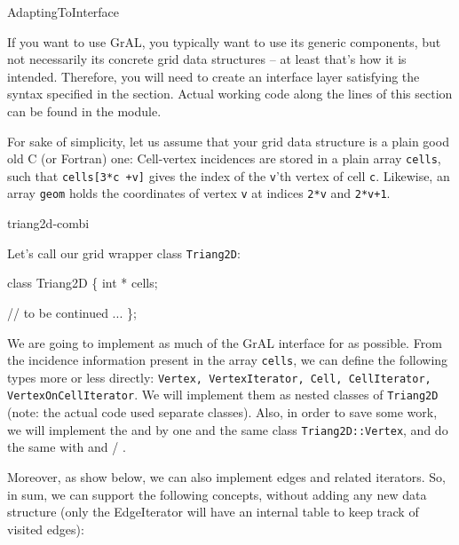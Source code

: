 \begin{Label}{AdaptingToInterface}
\end{Label}


If you want to use GrAL, you typically want to use its generic
components, but not necessarily its concrete grid data structures
-- at least that's how it is intended.
Therefore, you will need to create an interface layer 
satisfying the syntax specified in the  section.
Actual working code along the lines of this section 
can be found in the  module.

For sake of simplicity, let us assume that your grid data structure
is a plain  good old C (or Fortran) one:
Cell-vertex incidences are stored in a plain array \texttt{cells},
such that \texttt{cells[3*c +v]} gives the index of the \texttt{v}'th vertex
of cell \texttt{c}. 
Likewise, an array \texttt{geom} 
holds the coordinates of vertex \texttt{v}
at indices \texttt{2*v} and \texttt{2*v+1}.

\begin{Label}{triang2d-combi}
\end{Label}

Let's call our grid wrapper class \texttt{Triang2D}:
\begin{example}
class Triang2D \{
  int * cells;

  // to be continued ...
\};
\end{example}
We are going to implement as much of the GrAL interface for 
as possible.
From the incidence information present in the array \texttt{cells},
we can define  the following types more or less directly:
\texttt{Vertex, VertexIterator, Cell, CellIterator, VertexOnCellIterator}.
We will implement them as nested classes of \texttt{Triang2D}
(note: the actual code used separate classes).
Also, in order to save some work, we will implement the
 and  
by one and the same class
\texttt{Triang2D::Vertex},
and do the same with 
and   / .


Moreover, as show below, we can also implement edges and related iterators.
So, in sum, we can support the following concepts,
without adding any new data structure
(only the EdgeIterator will have an internal table to keep track of visited edges):

